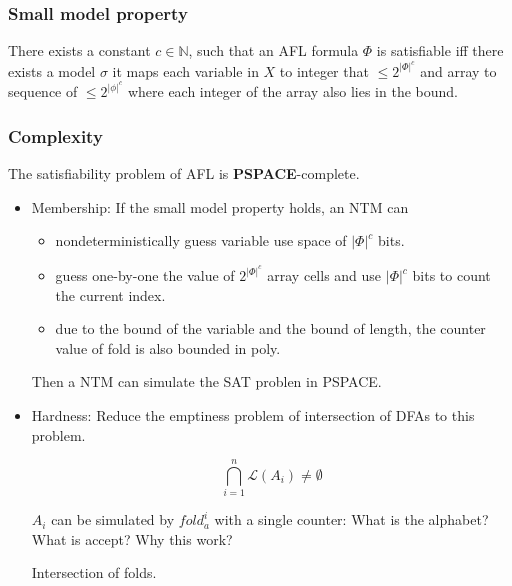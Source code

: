 \documentclass[11pt]{beamer}
\begin{document}
\begin{frame}\frametitle{Small model property}
\begin{lemma}
There exists a constant $c\in \mathbb{N}$, such that an AFL formula $\Phi$ is satisfiable iff there exists a model $\sigma$ it maps each variable in $X$ to integer that $\le 2^{|\Phi|^c}$ and array to sequence of $\le 2^{|\phi|^c}$ where each integer of the array also lies in the bound.
\end{lemma}

\end{frame}

\begin{frame}\frametitle{Complexity}


\begin{theorem}
The satisfiability problem of AFL is \textbf{PSPACE}-complete.

\end{theorem}
\begin{itemize}
\item Membership:
If the small model property holds, an NTM can
\begin{itemize}
\item nondeterministically guess variable use space of $|\Phi|^c$ bits.
\item guess one-by-one the value of $2^{|\Phi|^c}$ array cells and use $|\Phi|^c$ bits to count the current index.
\item due to the bound of the variable and the bound of length, the counter value of fold is also bounded in poly.
\end{itemize} 

Then a NTM can simulate the SAT problen in PSPACE.








\item Hardness:
Reduce the emptiness problem of intersection of DFAs to this problem.

\[\bigcap_{i = 1}^n \mathcal{L}(A_i)\ne \emptyset\]

$A_i$ can be simulated by $fold^i_a$ with a single counter: What is the alphabet? What is accept? Why this work?

Intersection of folds.
\end{itemize}

\end{frame}
\end{document}
